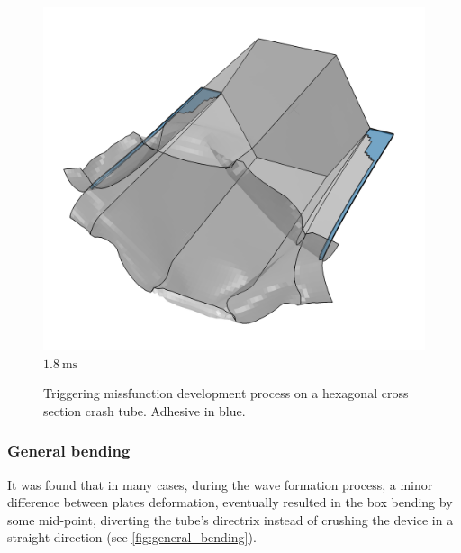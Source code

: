 \documentclass[
documentsize = a4, %
font = cmr, %
typesize = 11, %
printmode = true,
onehalfspacing = true,
language = en, %
titlepage = udciccp, %
degree = pt, %
dedication = true,
acknowledgements = true,
abstract-en = true,
abstract-es = false,
abstract-ga = false,
epigraphs = true,
toc = true,
lof = true,
lot = true,
frontmatterintoc = false,
notation = false,
minimal = false,
]{UDCthesis}
\begin{document}
\begin{figure}
	\quad
	\begin{minipage}[b]{.3\linewidth}
		\centering
		\includegraphics[width=\linewidth]{IMG_CUTRES/hex3}
		$\SI{1.8}{\ms}$
	\end{minipage}
	\caption[Triggering missfunction development process on a hexagonal cross section crash tube.]{Triggering missfunction development process on a hexagonal cross section crash tube. Adhesive in blue.}
	\label{fig:hex_tmf}
\end{figure}

\subsubsection{General bending}

It was found that in many cases, during the wave formation process, a minor difference between plates deformation, eventually resulted in the box bending by some mid-point, diverting the tube's directrix instead of crushing the device in a straight direction (see \cref{fig:general_bending}).
\end{document}
